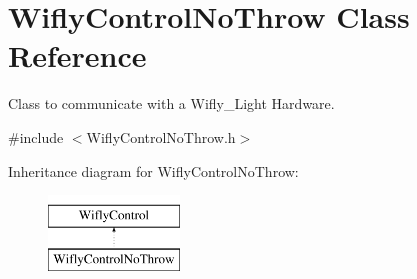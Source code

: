 \hypertarget{class_wifly_control_no_throw}{\section{Wifly\-Control\-No\-Throw Class Reference}
\label{class_wifly_control_no_throw}
}


Class to communicate with a Wifly\-\_\-\-Light Hardware.  




{\ttfamily \#include $<$Wifly\-Control\-No\-Throw.\-h$>$}

Inheritance diagram for Wifly\-Control\-No\-Throw\-:\begin{figure}[H]
\begin{center}
\leavevmode
\includegraphics[height=2.000000cm]{class_wifly_control_no_throw}
\end{center}
\end{figure}

